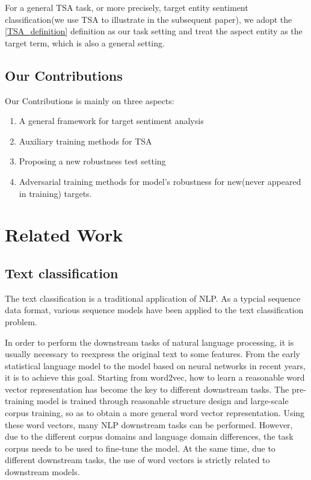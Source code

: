 \documentclass[fyp]{socreport}
\begin{document}
For a general TSA task, or more precisely, target entity sentiment classification(we use TSA to illustrate in the subsequent paper), we adopt the \ref{TSA_definition} definition as our task setting and treat the aspect entity as the target term, which is also a general setting.

\section{Our Contributions}
Our Contributions is mainly on three aspects:
\begin{enumerate}
    \item A general framework for target sentiment analysis
    \item Auxiliary training methods for TSA
    \item Proposing a new robustness test setting
    \item Adversarial training methods for model's robustness for new(never appeared in training) targets.
\end{enumerate}


\chapter{Related Work}
\label{ch:related}
\section{Text classification}
The text classification is a traditional application of NLP. As a typcial sequence data format, various sequence models have been applied to the text classification problem. 




In order to perform the downstream tasks of natural language processing, it is usually necessary to reexpress the original text to some features. From the early statistical language model to the model based on neural networks in recent years, it is to achieve this goal. Starting from word2vec, how to learn a reasonable word vector representation has become the key to different downstream tasks. The pre-training model is trained through reasonable structure design and large-scale corpus training, so as to obtain a more general word vector representation. Using these word vectors, many NLP downstream tasks can be performed. However, due to the different corpus domains and language domain differences, the task corpus needs to be used to fine-tune the model. At the same time, due to different downstream tasks, the use of word vectors is strictly related to  downstream models.
\end{document}
